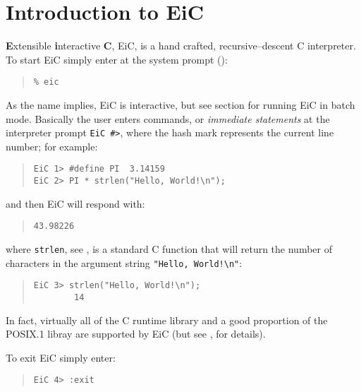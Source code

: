 \chapter{Introduction to EiC}

{\bf E}xtensible {\bf i}nteractive {\bf C}, EiC, is a hand crafted,
recursive--descent C interpreter. To start EiC simply enter at the
system prompt (\T{\%}):
\begin{quote}
\begin{verbatim}
% eic
\end{verbatim}
\end{quote}

As the name implies, EiC is interactive, but see section
 for running EiC in batch mode.  Basically the user
enters commands, or {\it immediate statements} at the interpreter
prompt {\tt EiC \#>}, where the hash mark represents the current line
number; for example:
\small
\begin{quote}
\begin{verbatim}
EiC 1> #define PI  3.14159
EiC 2> PI * strlen("Hello, World!\n");
\end{verbatim}
\end{quote}
\normalsize

and then EiC will respond with:
\small
\begin{quote}
\begin{verbatim}
43.98226
\end{verbatim}
\end{quote}
\normalsize

where {\tt strlen}, see , is a standard C function
that will return the number of characters in the argument string
\verb+"Hello, World!\n"+:
\small
\begin{quote}
\begin{verbatim}
EiC 3> strlen("Hello, World!\n");
        14
\end{verbatim}
\end{quote}
\normalsize
In fact, virtually all of the C runtime library and a good proportion
of the POSIX.1 libray are supported by EiC (but see ,
for details).

To exit EiC simply enter:

\small
\begin{quote}
\begin{verbatim}
EiC 4> :exit
\end{verbatim}
\end{quote}
\normalsize


